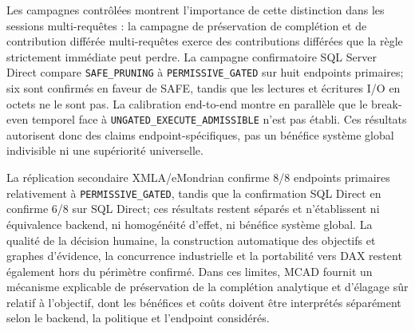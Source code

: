 \documentclass[journal]{IEEEtran}
\begin{document}
Les campagnes contrôlées montrent l'importance de cette distinction dans les sessions multi-requêtes : la campagne de préservation de complétion et de contribution différée multi-requêtes exerce des contributions différées que la règle strictement immédiate peut perdre. La campagne confirmatoire SQL Server Direct compare \texttt{SAFE\_PRUNING} à \texttt{PERMISSIVE\_GATED} sur huit endpoints primaires; six sont confirmés en faveur de SAFE, tandis que les lectures et écritures I/O en octets ne le sont pas. La calibration end-to-end montre en parallèle que le break-even temporel face à \texttt{UNGATED\_EXECUTE\_ADMISSIBLE} n'est pas établi. Ces résultats autorisent donc des claims endpoint-spécifiques, pas un bénéfice système global indivisible ni une supériorité universelle.

La réplication secondaire XMLA/eMondrian confirme 8/8 endpoints primaires relativement à \texttt{PERMISSIVE\_GATED}, tandis que la confirmation SQL Direct en confirme 6/8 sur SQL Direct; ces résultats restent séparés et n'établissent ni équivalence backend, ni homogénéité d'effet, ni bénéfice système global. La qualité de la décision humaine, la construction automatique des objectifs et graphes d'évidence, la concurrence industrielle et la portabilité vers DAX restent également hors du périmètre confirmé. Dans ces limites, MCAD fournit un mécanisme explicable de préservation de la complétion analytique et d'élagage sûr relatif à l'objectif, dont les bénéfices et coûts doivent être interprétés séparément selon le backend, la politique et l'endpoint considérés.

\endgroup

\FloatBarrier
\appendices



\FloatBarrier
\balance


\end{document}

